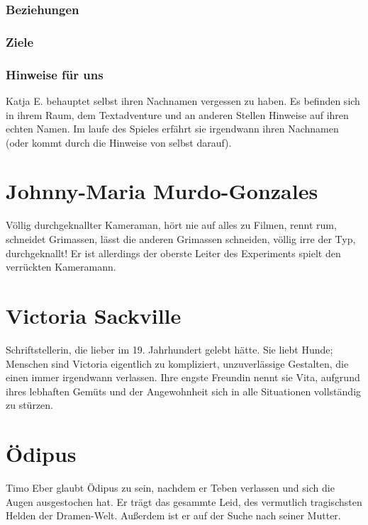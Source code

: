 \documentclass[12pt, a4paper, openany]{report}
\begin{document}
\subsubsection{Beziehungen}
\subsubsection{Ziele}
\subsubsection{Hinweise für uns}
Katja E. behauptet selbst ihren Nachnamen vergessen zu haben. 
Es befinden sich in ihrem Raum, dem Textadventure und an anderen Stellen Hinweise auf ihren echten Namen. 
Im laufe des Spieles erfährt sie irgendwann ihren Nachnamen (oder kommt durch die Hinweise von selbst darauf). 

\section{Johnny-Maria Murdo-Gonzales}
Völlig durchgeknallter Kameraman, hört nie auf alles zu Filmen, rennt rum, schneidet Grimassen, lässt die anderen Grimassen schneiden, völlig irre der Typ, durchgeknallt! 
Er ist allerdings der oberste Leiter des Experiments \glqq spielt\grqq{} den verrückten Kameramann. 

\section{Victoria Sackville}
Schriftstellerin, die lieber im 19. Jahrhundert gelebt hätte. Sie liebt Hunde; Menschen sind Victoria eigentlich zu kompliziert, unzuverlässige Gestalten, die einen immer irgendwann verlassen. Ihre engste Freundin nennt sie Vita, aufgrund ihres lebhaften Gemüts und der Angewohnheit sich in alle Situationen vollständig zu stürzen.

\section{Ödipus}
Timo Eber glaubt Ödipus zu sein, nachdem er Teben verlassen und sich die Augen ausgestochen hat.
Er trägt das gesammte Leid, des vermutlich tragischsten Helden der Dramen-Welt.
Außerdem ist er auf der Suche nach seiner Mutter.
\end{document}
